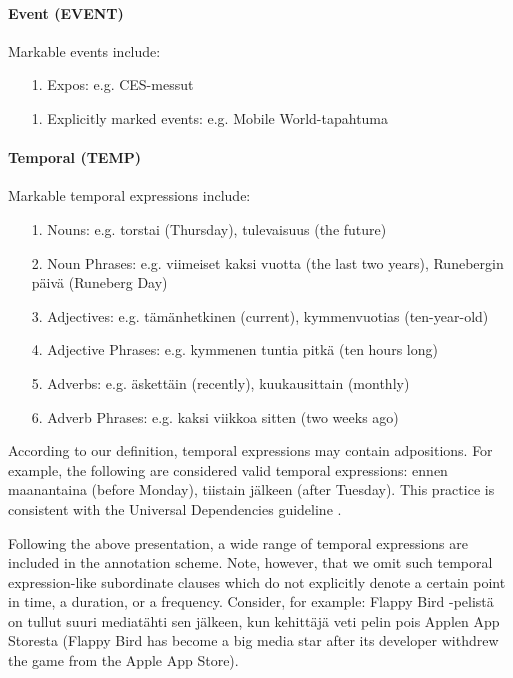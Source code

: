 \documentclass[11pt]{article}
\begin{document}
\paragraph{Event (EVENT)}

Markable events include:

\begin{itemize}

\item[1.] Expos: e.g. CES-messut
\item[1.] Explicitly marked events: e.g. Mobile World-tapahtuma

\end{itemize}




\paragraph{Temporal (TEMP)} Markable temporal expressions include:

\begin{itemize}

\item[1.] Nouns: e.g. torstai (Thursday), tulevaisuus (the future)
\item[2.] Noun Phrases: e.g. viimeiset kaksi vuotta (the last two years),  Runebergin p\"aiv\"a (Runeberg Day)
\item[3.] Adjectives: e.g. t\"am\"anhetkinen (current), kymmenvuotias (ten-year-old) 
\item[4.] Adjective Phrases: e.g. kymmenen tuntia pitk\"a (ten hours long) 
\item[5.] Adverbs: e.g. \"askett\"ain (recently), kuukausittain (monthly)
\item[6.] Adverb Phrases: e.g. kaksi viikkoa sitten (two weeks ago)

\end{itemize}

According to our definition, temporal expressions may contain adpositions. For example, the following are considered valid temporal expressions: ennen maanantaina (before Monday), tiistain j\"alkeen (after Tuesday). This practice is consistent with the Universal Dependencies guideline \cite{}. 

Following the above presentation, a wide range of temporal expressions are included in the annotation scheme. Note, however, that we omit such temporal expression-like subordinate clauses which do not explicitly denote a certain point in time, a duration, or a frequency. Consider, for example: Flappy  Bird -pelist\"a on tullut suuri mediat\"ahti sen j\"alkeen, kun kehitt\"aj\"a veti pelin pois Applen App Storesta (Flappy Bird has become a big media star after its developer withdrew the game from the Apple App Store).
\end{document}
